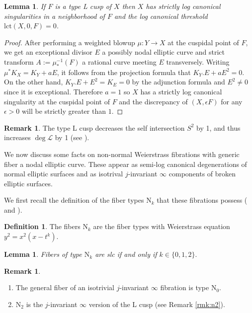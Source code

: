 \documentclass[11pt]{amsart}
\newtheorem{lemma}[theorem]{Lemma}
\theoremstyle{definition}
\newtheorem{definition}[theorem]{Definition}
\newtheorem{remark}[theorem]{Remark}
\theoremstyle{remark}
\begin{document}
	
	\begin{lemma}\label{lem:lcusp} If $F$ is a type L cusp of $X$ then $X$ has strictly log canonical singularities in a neighborhood of $F$ and the log canonical threshold $\mathrm{lct}(X,0,F)  = 0$. \end{lemma}
	
	\begin{proof} After performing a weighted blowup $\mu: Y \to X$ at the cuspidal point of $F$, we get an exceptional divisor $E$ a possibly nodal elliptic curve and strict transform $A:= \mu_*^{-1}(F)$ a rational curve meeting $E$ transversely. Writing $\mu^*K_X = K_Y + aE$, it follows from the projection formula that $K_Y.E + aE^2 = 0$. On the other hand, $K_Y.E + E^2 = K_E = 0$ by the adjunction formula and $E^2 \neq 0$ since it is exceptional. Therefore $a = 1$ so $X$ has a strictly log canonical singularity at the cuspidal point of $F$ and the discrepancy of $(X,\epsilon F)$ for any $\epsilon > 0$ will be strictly greater than $1$.
	\end{proof} 
	
	\begin{remark}\label{rmk:lcusp} The type L cusp decreases the self intersection $S^2$ by 1, and thus increases $\deg \mathscr{L}$ by 1 (see \cite[Remark 5.3.8]{ln}). \end{remark}
	
	We now discuss some facts on non-normal Weierstrass fibrations with generic fiber a nodal elliptic curve. These appear as semi-log canonical degenerations of normal elliptic surfaces and as isotrival $j$-invariant $\infty$ components of broken elliptic surfaces. 
	
	
	We first recall the definition of the fiber types $\mathrm{N}_k$ that these fibrations possess (\cite[Section 5]{calculations} and \cite[Lemma 3.2.2]{ln}). 
	
	\begin{definition}\label{def:nk} The fibers $\mathrm{N}_k$ are the fiber types with Weierstrass equation $y^2 = x^2(x-t^k)$. \end{definition}
	
	\begin{lemma}\cite[Lemma 3.2.2]{ln} Fibers of type $\mathrm{N}_k$ are slc if and only if $k \in \{0, 1, 2 \}.$ \end{lemma}
	
	\begin{remark} \leavevmode
		\begin{enumerate}
			\item The general fiber of an isotrivial $j$-invariant $\infty$ fibration is type $\mathrm{N}_0$.
			\item $\mathrm{N}_2$ is the $j$-invariant $\infty$ version of the L cusp (see Remark \ref{rmk:n2}).
		\end{enumerate}
	\end{remark} 
	
\end{document}
